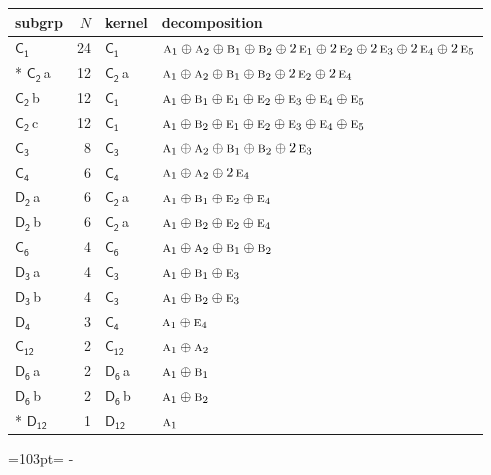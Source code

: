 \documentclass[10pt,a4paper]{article}
\newcommand{\needspace}[1]{\par\penalty-100\begingroup\dimen0=#1\relax\dimen2=\pagegoal
  \advance\dimen2-\pagetotal\ifdim\dimen0>\dimen2\relax\ifdim\dimen2>0pt\vfil\break\fi\fi
  \endgroup}
\numberwithin{equation}{section}
\newcommand{\grp}[1]{\mathsf{#1}}
\newcommand{\irr}[1]{\text{\normalfont\scshape #1}}
\newcommand{\clsletter}[1]{\,{\scriptsize\color{black!55}#1}}
\newlength{\fillwidth}\newlength{\cellwidth}\newlength{\colwidth}
\begin{document}
{\begin{longtable}{@{}lrl>{\RaggedRight\arraybackslash}p{\fillwidth}@{}}
subgrp & $N$ & kernel & decomposition\\\midrule\endhead
\bottomrule\endfoot\endlastfoot
\href{C1.pdf}{$\grp{C_{1}}$} & 24 & \href{C1.pdf}{$\grp{C_{1}}$} & $\irr{a}_{1}\oplus \irr{a}_{2}\oplus \irr{b}_{1}\oplus \irr{b}_{2}\oplus 2\,\irr{e}_{1}\oplus 2\,\irr{e}_{2}\oplus 2\,\irr{e}_{3}\oplus 2\,\irr{e}_{4}\oplus 2\,\irr{e}_{5}$\\*
\href{C2.pdf}{$\grp{C_{2}}$}\clsletter{a} & 12 & \href{C2.pdf}{$\grp{C_{2}}$}\clsletter{a} & $\irr{a}_{1}\oplus \irr{a}_{2}\oplus \irr{b}_{1}\oplus \irr{b}_{2}\oplus 2\,\irr{e}_{2}\oplus 2\,\irr{e}_{4}$\\
\href{C2.pdf}{$\grp{C_{2}}$}\clsletter{b} & 12 & \href{C1.pdf}{$\grp{C_{1}}$} & $\irr{a}_{1}\oplus \irr{b}_{1}\oplus \irr{e}_{1}\oplus \irr{e}_{2}\oplus \irr{e}_{3}\oplus \irr{e}_{4}\oplus \irr{e}_{5}$\\
\href{C2.pdf}{$\grp{C_{2}}$}\clsletter{c} & 12 & \href{C1.pdf}{$\grp{C_{1}}$} & $\irr{a}_{1}\oplus \irr{b}_{2}\oplus \irr{e}_{1}\oplus \irr{e}_{2}\oplus \irr{e}_{3}\oplus \irr{e}_{4}\oplus \irr{e}_{5}$\\
\href{C3.pdf}{$\grp{C_{3}}$} & 8 & \href{C3.pdf}{$\grp{C_{3}}$} & $\irr{a}_{1}\oplus \irr{a}_{2}\oplus \irr{b}_{1}\oplus \irr{b}_{2}\oplus 2\,\irr{e}_{3}$\\
\href{C4.pdf}{$\grp{C_{4}}$} & 6 & \href{C4.pdf}{$\grp{C_{4}}$} & $\irr{a}_{1}\oplus \irr{a}_{2}\oplus 2\,\irr{e}_{4}$\\
\href{D2.pdf}{$\grp{D_{2}}$}\clsletter{a} & 6 & \href{C2.pdf}{$\grp{C_{2}}$}\clsletter{a} & $\irr{a}_{1}\oplus \irr{b}_{1}\oplus \irr{e}_{2}\oplus \irr{e}_{4}$\\
\href{D2.pdf}{$\grp{D_{2}}$}\clsletter{b} & 6 & \href{C2.pdf}{$\grp{C_{2}}$}\clsletter{a} & $\irr{a}_{1}\oplus \irr{b}_{2}\oplus \irr{e}_{2}\oplus \irr{e}_{4}$\\
\href{C6.pdf}{$\grp{C_{6}}$} & 4 & \href{C6.pdf}{$\grp{C_{6}}$} & $\irr{a}_{1}\oplus \irr{a}_{2}\oplus \irr{b}_{1}\oplus \irr{b}_{2}$\\
\href{D3.pdf}{$\grp{D_{3}}$}\clsletter{a} & 4 & \href{C3.pdf}{$\grp{C_{3}}$} & $\irr{a}_{1}\oplus \irr{b}_{1}\oplus \irr{e}_{3}$\\
\href{D3.pdf}{$\grp{D_{3}}$}\clsletter{b} & 4 & \href{C3.pdf}{$\grp{C_{3}}$} & $\irr{a}_{1}\oplus \irr{b}_{2}\oplus \irr{e}_{3}$\\
\href{D4.pdf}{$\grp{D_{4}}$} & 3 & \href{C4.pdf}{$\grp{C_{4}}$} & $\irr{a}_{1}\oplus \irr{e}_{4}$\\
\href{C12.pdf}{$\grp{C_{12}}$} & 2 & \href{C12.pdf}{$\grp{C_{12}}$} & $\irr{a}_{1}\oplus \irr{a}_{2}$\\
\href{D6.pdf}{$\grp{D_{6}}$}\clsletter{a} & 2 & \href{D6.pdf}{$\grp{D_{6}}$}\clsletter{a} & $\irr{a}_{1}\oplus \irr{b}_{1}$\\
\href{D6.pdf}{$\grp{D_{6}}$}\clsletter{b} & 2 & \href{D6.pdf}{$\grp{D_{6}}$}\clsletter{b} & $\irr{a}_{1}\oplus \irr{b}_{2}$\\*
\href{D12.pdf}{$\grp{D_{12}}$} & 1 & \href{D12.pdf}{$\grp{D_{12}}$} & $\irr{a}_{1}$\\
\bottomrule\end{longtable}}
\needspace{103pt}
\end{document}

